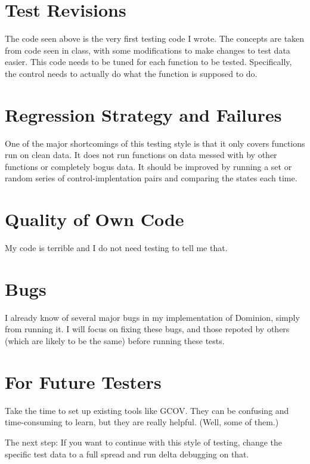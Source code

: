 \documentclass[letterpaper,12pt]{article}
\begin{document}
\section{Test Revisions}
The code seen above is the very first testing code I wrote. The concepts are
taken from code seen in class, with some modifications to make changes to test
data easier. This code needs to be tuned for each function to be tested.
Specifically, the control needs to actually do what the function is supposed to
do.

\section{Regression Strategy and Failures}
One of the major shortcomings of this testing style is that it only covers
functions run on clean data. It does not run functions on data messed with by
other functions or completely bogus data. It should be improved by running a
set or random series of control-implentation pairs and comparing the states
each time.

\section{Quality of Own Code}
My code is terrible and I do not need testing to tell me that.

\section{Bugs}
I already know of several major bugs in my implementation of Dominion, simply
from running it. I will focus on fixing these bugs, and those repoted by others
(which are likely to be the same) before running these tests.

\section{For Future Testers}
Take the time to set up existing tools like GCOV. They can be confusing and
time-consuming to learn, but they are really helpful. (Well, some of them.)

The next step: If you want to continue with this style of testing, change the
specific test data to a full spread and run delta debugging on that.
\end{document}
